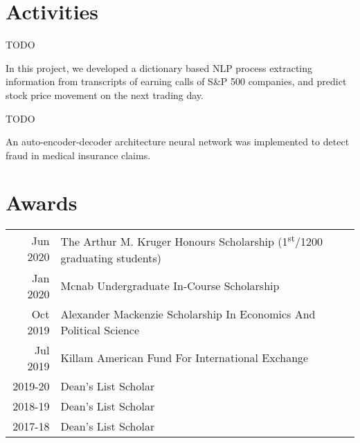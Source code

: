 \documentclass[letterpaper]{deedy-resume} %
\begin{document}
\begin{minipage}[t]{0.66\textwidth}
\sectionspace %


\section{Activities}


TODO

\sectionspace %


In this project, we developed a dictionary based NLP process extracting information from transcripts of earning calls of S\&P 500 companies, and predict stock price movement on the next trading day.

\sectionspace %


TODO

\sectionspace %


An auto-encoder-decoder architecture neural network was implemented to detect fraud in medical insurance claims.

\sectionspace %


\section{Awards} 

\begin{tabular}{rll}
Jun 2020	 & The Arthur M. Kruger Honours Scholarship (1\textsuperscript{st}/1200 graduating students)
\\
Jan 2020	 & Mcnab Undergraduate In-Course Scholarship \\
Oct 2019	 & Alexander Mackenzie Scholarship In Economics And Political Science\\
Jul 2019	 & Killam American Fund For International Exchange \\
2019-20		 & Dean's List Scholar \\
2018-19		 & Dean's List Scholar \\
2017-18		 & Dean's List Scholar
\end{tabular}


\end{minipage}
\end{document}

